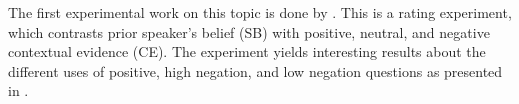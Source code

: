 \documentclass[output=paper,colorlinks,citecolor=brown]{langscibook}
\begin{document}
The first experimental work on this topic is done by \citet{roelofsen2013}. This is a rating experiment, which contrasts prior speaker's belief (SB) with positive, neutral, and negative contextual evidence (CE). The experiment yields interesting results about the different uses of positive, high negation, and low negation questions as presented in .

\begin{figure}
\subfigure[LNPQ]{
}
\end{figure}
\end{document}
